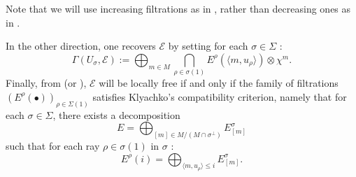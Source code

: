 \documentclass[a4paper,10pt]{amsart}
\theoremstyle{plain}{
    \newtheorem{theorem}{Theorem}[section]
    \newtheorem{lemma}[theorem]{Lemma}
    \newtheorem{corollary}[theorem]{Corollary}
    \newtheorem{proposition}[theorem]{Proposition}
    \newtheorem{conjecture}[theorem]{Conjecture}
}
\theoremstyle{definition}{
    \newtheorem{definition}[theorem]{Definition}
    \newtheorem{defn-thm}[theorem]{Definition-Theorem}
    \newtheorem{example}[theorem]{Example}
    \newtheorem{notation}[theorem]{Notation}
}
\theoremstyle{remark}{
    \newtheorem{remark}[theorem]{Remark}
    \newtheorem{problem}[theorem]{Problem}
    \newtheorem{question}[theorem]{Question}
}
\def\cE{\mathcal{E}}
\begin{document}
\begin{remark}
Note that we will use increasing filtrations as in \cite{Per04}, rather than decreasing ones as in \cite{Kly90}.
\end{remark}
 
In the other direction, one recovers $\cE$ by setting for each $\sigma\in\Sigma$ :
\begin{equation}
  \label{eq:sheaf from family of filtrations}
  \Gamma(U_{\sigma}, \cE):=\bigoplus_{m\in M} \bigcap_{\rho\in\sigma(1)} E^\rho(\langle m,u_\rho\rangle)\otimes \chi^m.
 \end{equation}
Finally, from \cite[Theorem 2.2.1]{Kly90} (or \cite[Section 5]{Per04}),  $\cE$ will be locally free  if and only if the family of filtrations $(E^\rho(\bullet))_{\rho\in\Sigma(1)}$ satisfies Klyachko's compatibility criterion, namely that for each $\sigma\in\Sigma$, there exists a decomposition 
$$
E= \bigoplus_{[m]\in M/(M\cap\sigma^\perp)} E^\sigma_{[m]}
$$
such that for each ray  
$\rho\in\sigma(1)$ in $\sigma$ :
\begin{equation}
 \label{eq:klyachko compatibility}
E^\rho(i)=\bigoplus_{\langle m,u_\rho\rangle\leq i}  E^\sigma_{[m]}.
\end{equation}
\end{document}
